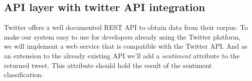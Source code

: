 	\subsection{API layer with twitter API integration}
	Twitter offers a well documented REST API to obtain data from their corpus. To make our system easy to use for developers already using the Twitter platform, we will implement a web service that is compatible with the Twitter API. And as an extension to the already existing API we'll add a \emph{sentiment} attribute to the returned tweet. This attribute should hold the result of the sentiment classification.
	
	
